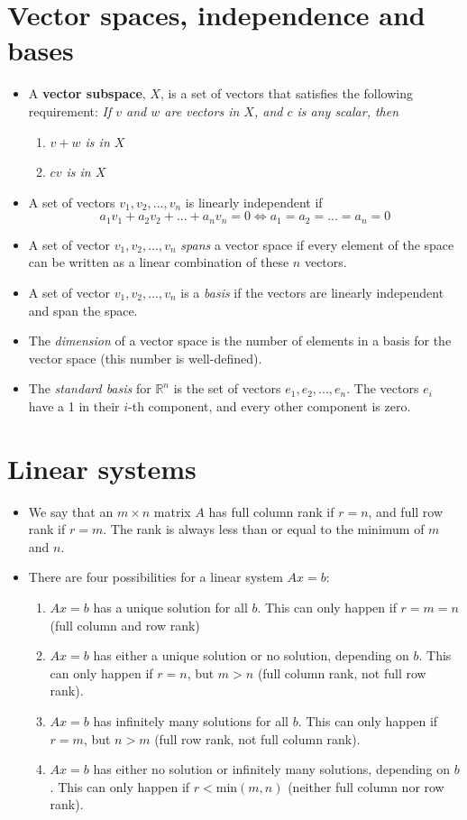 \documentclass[11pt]{article}
\begin{document}
\newpage

\section{Vector spaces, independence and bases}
\begin{itemize}
\item A \textbf{vector subspace}, $X$, is a set of vectors that satisfies the following requirement: \emph{If $v$ and $w$ are vectors in $X$, and $c$ is any scalar, then}
\begin{enumerate}
\item \emph{$v+w$ is in $X$}
\item \emph{$cv$ is in $X$}
\end{enumerate}
\item A set of vectors $v_1, v_2, ..., v_n$ is linearly independent if 
$$\boxed{a_1v_1 + a_2v_2 + ... + a_n v_n = 0 \iff a_1=a_2=...=a_n=0}$$
\item A set of vector $v_1, v_2, ..., v_n$ \emph{spans} a vector space if every element of the space can be written as a linear combination of these $n$ vectors.
\item A set of vector $v_1, v_2, ..., v_n$ is a \emph{basis} if the vectors are linearly independent and span the space. 
\item The \emph{dimension} of a vector space is the number of elements in a basis for the vector space (this number is well-defined). 
\item The \emph{standard basis} for $\mathbb{R}^n$ is the set of vectors $e_1, e_2, ..., e_n$. The vectors $e_i$ have a 1 in their $i$-th component, and every other component is zero. 
\end{itemize}

\newpage

\section{Linear systems}
\begin{itemize}
\item We say that an $m\times n$ matrix $A$ has full column rank if $r=n$, and full row rank if $r=m$. The rank is always less than or equal to the minimum of $m$ and $n$.
\item There are four possibilities for a linear system $Ax = b$: 
\begin{enumerate}
\item $Ax = b$ has a unique solution for all $b$. This can only happen if $r=m=n$ (full column and row rank)
\item $Ax=b$ has either a unique solution or no solution, depending on $b$. This can only happen if $r=n$, but $m>n$ (full column rank, not full row rank).
\item $Ax=b$ has infinitely many solutions for all $b$. This can only happen if $r=m$, but $n>m$ (full row rank, not full column rank).
\item $Ax = b$ has either no solution or infinitely many solutions, depending on $b$. This can only happen if $r<\text{min}(m,n)$ (neither full column nor row rank). 
\end{enumerate}
\end{itemize}
\end{document}
